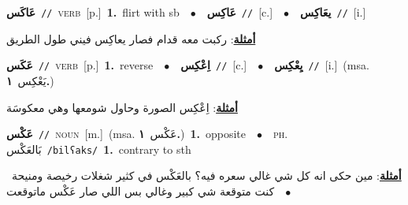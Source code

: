 \documentclass[10pt,a4paper,twoside]{article} %
\begin{document}
\begin{multicols}{2}
{\setlength\topsep{0pt}\textbf{\foreignlanguage{arabic}{عَاكَس}}\ {\color{gray}\texttt{//}\color{black}}\ \textsc{verb}\ [p.]\ \textbf{1.}~flirt with sb\ \ $\bullet$\ \ \setlength\topsep{0pt}\textbf{\foreignlanguage{arabic}{عَاكِس}}\ {\color{gray}\texttt{//}\color{black}}\ [c.]\ \ $\bullet$\ \ \setlength\topsep{0pt}\textbf{\foreignlanguage{arabic}{يعَاكِس}}\ {\color{gray}\texttt{//}\color{black}}\ [i.]\  \begin{flushright}\color{gray}\foreignlanguage{arabic}{\textbf{\underline{\foreignlanguage{arabic}{أمثلة}}}: ركبت معه قدام فصار يعاكِس فيني طول الطريق}\end{flushright}\color{black}} \vspace{2mm}

{\setlength\topsep{0pt}\textbf{\foreignlanguage{arabic}{عَكَس}}\ {\color{gray}\texttt{//}\color{black}}\ \textsc{verb}\ [p.]\ \textbf{1.}~reverse\ \ $\bullet$\ \ \setlength\topsep{0pt}\textbf{\foreignlanguage{arabic}{اِعْكِس}}\ {\color{gray}\texttt{//}\color{black}}\ [c.]\ \ $\bullet$\ \ \setlength\topsep{0pt}\textbf{\foreignlanguage{arabic}{يِعْكِس}}\ {\color{gray}\texttt{//}\color{black}}\ [i.]\ \color{gray}(msa. \foreignlanguage{arabic}{يَعْكِس}~\foreignlanguage{arabic}{\textbf{١.}})\color{black}\  \begin{flushright}\color{gray}\foreignlanguage{arabic}{\textbf{\underline{\foreignlanguage{arabic}{أمثلة}}}: اِعْكِس الصورة وحاول شومعها وهي معكوسَة}\end{flushright}\color{black}} \vspace{2mm}

{\setlength\topsep{0pt}\textbf{\foreignlanguage{arabic}{عَكْس}}\ {\color{gray}\texttt{//}\color{black}}\ \textsc{noun}\ [m.]\ \color{gray}(msa. \foreignlanguage{arabic}{عَكْس}~\foreignlanguage{arabic}{\textbf{١.}})\color{black}\ \textbf{1.}~opposite\ \ $\bullet$\ \ \textsc{ph.} \color{gray} \foreignlanguage{arabic}{بَالعَكْس}\color{black}\ {\color{gray}\texttt{/{\sffamily bilʕaks}/}\color{black}}\ \textbf{1.}~contrary to sth\  \begin{flushright}\color{gray}\foreignlanguage{arabic}{\textbf{\underline{\foreignlanguage{arabic}{أمثلة}}}: مين حكى انه كل شي غالي سعره فيه؟ بالعَكْس في كثير شغلات رخيصة ومنيحة\ $\bullet$\ \  كنت متوقعة شي كبير وغالي بس اللي صار عَكْس ماتوقعت}\end{flushright}\color{black}} \vspace{2mm}


\end{multicols}
\end{document}
